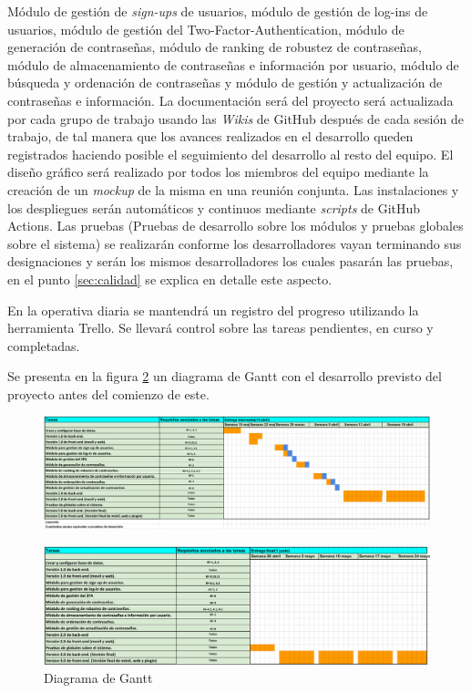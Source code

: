 \documentclass{article}
\begin{document}
Módulo de gestión de \textit{sign-ups} de usuarios, módulo de gestión de log-ins de usuarios, módulo de gestión del Two-Factor-Authentication, módulo de generación de contraseñas, módulo de ranking de robustez de contraseñas, módulo de almacenamiento de contraseñas e información por usuario, módulo de búsqueda y ordenación de contraseñas y módulo de gestión y actualización de contraseñas e información. La documentación será del proyecto será actualizada por cada grupo de trabajo usando las \textit{Wikis} de GitHub después de cada sesión de trabajo, de tal manera que los avances realizados en el desarrollo queden registrados haciendo posible el seguimiento del desarrollo al resto del equipo. El diseño gráfico será realizado por todos los miembros del equipo mediante la creación de un \textit{mockup} de la misma en una reunión conjunta. Las instalaciones y los despliegues serán automáticos y continuos mediante \textit{scripts} de GitHub Actions. Las pruebas (Pruebas de desarrollo sobre los módulos y pruebas globales sobre el sistema) se realizarán conforme los desarrolladores vayan terminando sus designaciones y serán los mismos desarrolladores los cuales pasarán las pruebas, en el punto \ref{sec:calidad} se explica en detalle este aspecto.
 
En la operativa diaria se mantendrá un registro del progreso utilizando la herramienta Trello. Se llevará control sobre las tareas pendientes, en curso y completadas.
 
Se presenta en la figura \ref{gantt-2} un diagrama de Gantt con el desarrollo previsto del proyecto antes del comienzo de este.
 
\begin{landscape}
   \begin{figure}[H]
       \centering
       \includegraphics[width=1.4\textheight]{../images/diag-gantt-1.png}
       \label{gantt-1}
   \end{figure}
  
   \begin{figure}[H]
       \centering
       \includegraphics[width=1.4\textheight]{../images/diag-gantt-2.png}
       \caption{Diagrama de Gantt}
       \label{gantt-2}
   \end{figure}
\end{landscape}
  
\end{document}
